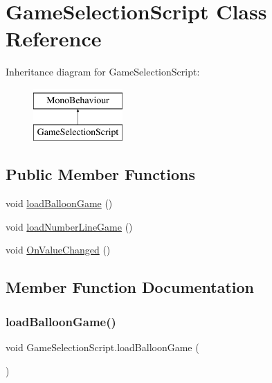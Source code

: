 \hypertarget{classGameSelectionScript}{}\section{Game\+Selection\+Script Class Reference}
\label{classGameSelectionScript}
Inheritance diagram for Game\+Selection\+Script\+:\begin{figure}[H]
\begin{center}
\leavevmode
\includegraphics[height=2.000000cm]{classGameSelectionScript}
\end{center}
\end{figure}
\subsection*{Public Member Functions}
\begin{DoxyCompactItemize}
\item 
void \hyperlink{classGameSelectionScript_a770ea1ab78778724bddaa13f703f8fbb}{load\+Balloon\+Game} ()
\item 
void \hyperlink{classGameSelectionScript_a30ede88539b295f2ad9c8d5ff5b4f7fa}{load\+Number\+Line\+Game} ()
\item 
void \hyperlink{classGameSelectionScript_aa8b90a1e8c5c5c1ea56d8d7494f1fa56}{On\+Value\+Changed} ()
\end{DoxyCompactItemize}


\subsection{Member Function Documentation}
\mbox{\label{classGameSelectionScript_a770ea1ab78778724bddaa13f703f8fbb}} 
\subsubsection{\texorpdfstring{load\+Balloon\+Game()}{loadBalloonGame()}}
{\footnotesize\ttfamily void Game\+Selection\+Script.\+load\+Balloon\+Game (\begin{DoxyParamCaption}{ }\end{DoxyParamCaption})\hspace{0.3cm}{\ttfamily [inline]}}

